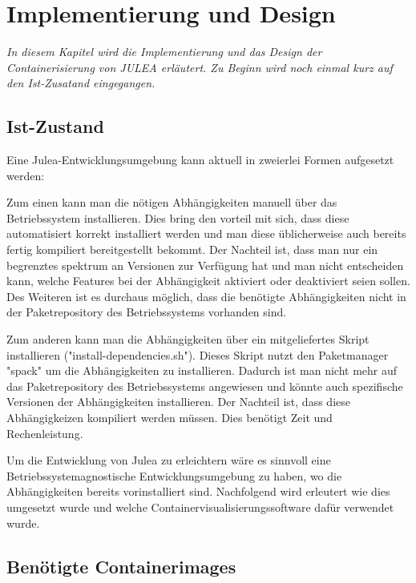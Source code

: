 \chapter{Implementierung und Design}
\label{cha:implementation_design}

\textit{In diesem Kapitel wird die Implementierung und das Design der Containerisierung von JULEA erläutert. Zu Beginn wird noch einmal kurz auf den Ist-Zusatand eingegangen.}

\section{Ist-Zustand}

Eine Julea-Entwicklungsumgebung kann aktuell in zweierlei Formen aufgesetzt werden:

Zum einen kann man die nötigen Abhängigkeiten manuell über das Betriebssystem installieren. Dies bring den vorteil mit sich, dass diese automatisiert korrekt installiert werden und man diese üblicherweise auch bereits fertig kompiliert bereitgestellt bekommt. Der Nachteil ist, dass man nur ein begrenztes spektrum an Versionen zur Verfügung hat und man nicht entscheiden kann, welche Features bei der Abhängigkeit aktiviert oder deaktiviert seien sollen. Des Weiteren ist es durchaus möglich, dass die benötigte Abhängigkeiten nicht in der Paketrepository des Betriebssystems vorhanden sind. 

Zum anderen kann man die Abhängigkeiten über ein mitgeliefertes Skript installieren ("install-dependencies.sh"). Dieses Skript nutzt den Paketmanager "spack" um die Abhängigkeiten zu installieren. Dadurch ist man nicht mehr auf das Paketrepository des Betriebssystems angewiesen und könnte auch spezifische Versionen der Abhängigkeiten installieren. Der Nachteil ist, dass diese Abhängigkeizen kompiliert werden müssen. Dies benötigt Zeit und Rechenleistung. 


Um die Entwicklung von Julea zu erleichtern wäre es sinnvoll eine Betriebssystemagnostische Entwicklungsumgebung zu haben, wo die Abhängigkeiten bereits vorinstalliert sind. Nachfolgend wird erleutert wie dies umgesetzt wurde und welche Containervisualisierungssoftware dafür verwendet wurde.

\section{Benötigte Containerimages}

